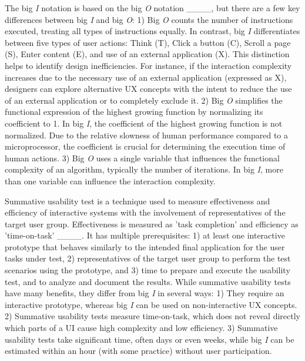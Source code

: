 The big \textit{I} notation is based on the big \textit{O} notation ____, but
there are a few key differences between big \textit{I} and big \textit{O}: 1) Big \textit{O} counts the number of instructions executed, treating all types of instructions equally. In contrast, big \textit{I} differentiates between five types of user actions: Think (T), Click a button (C), Scroll a page (S), Enter content (E), and use of an external application (X). This distinction helps to identify design inefficiencies. For instance, if the interaction complexity increases due to the necessary use of an external application (expressed as X), designers can explore alternative UX concepts with the intent to reduce the use of an external application or to completely exclude it. 2) Big \textit{O} simplifies the functional expression of the highest growing function by normalizing its coefficient to 1. In big \textit{I}, the coefficient of the highest growing function is not normalized. Due to the relative slowness of human performance compared to a microprocessor, the coefficient is crucial for determining the execution time of human actions. 3) Big \textit{O} uses a single variable that influences the functional complexity of an algorithm, typically the number of iterations. In big \textit{I}, more than one variable can influence the interaction complexity.

Summative usability test is a technique used to measure effectiveness and efficiency of interactive systems with the involvement of representatives of the target user group. Effectiveness is measured as 'task completion' and efficiency as 'time-on-task' ____. It has multiple prerequisites: 1) at least one interactive prototype that behaves similarly to the intended final application for the user tasks under test, 2) representatives of the target user group to perform the test scenarios using the prototype, and 3) time to prepare and execute the usability test, and to analyze and document the results. While summative usability tests have many benefits, they differ from big \textit{I} in several ways: 1) They require an interactive prototype, whereas big \textit{I} can be used on non-interactive UX concepts. 2) Summative usability tests measure time-on-task, which does not reveal directly which parts of a UI cause high complexity and low efficiency. 3) Summative usability tests take significant time, often days or even weeks, while big \textit{I} can be estimated within an hour (with some practice) without user participation.

